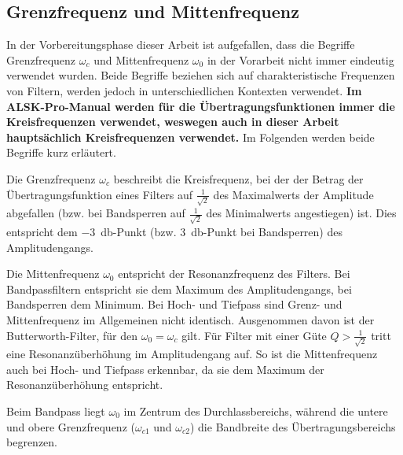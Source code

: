 \documentclass[../main_config.tex]{subfiles}
\begin{document}
\subsection{Grenzfrequenz und Mittenfrequenz}
\label{sec:omega0}
In der Vorbereitungsphase dieser Arbeit ist aufgefallen, dass die Begriffe Grenzfrequenz $\omega_c$ und Mittenfrequenz $\omega_0$ in der Vorarbeit \cite{LabANS} nicht immer eindeutig verwendet wurden. Beide Begriffe beziehen sich auf charakteristische Frequenzen von Filtern, werden jedoch in unterschiedlichen Kontexten verwendet. \textbf{Im ALSK-Pro-Manual werden für die Übertragungsfunktionen immer die Kreisfrequenzen verwendet, weswegen auch in dieser Arbeit hauptsächlich Kreisfrequenzen verwendet.} Im Folgenden werden beide Begriffe kurz erläutert.\par
\medskip


Die Grenzfrequenz $\omega_c$ beschreibt die Kreisfrequenz, bei der der Betrag der Übertragungsfunktion eines Filters auf $\frac{1}{\sqrt{2}}$ des Maximalwerts der Amplitude abgefallen (bzw. bei Bandsperren auf $\frac{1}{\sqrt{2}}$ des Minimalwerts angestiegen) ist. Dies entspricht dem \SI{-3}{\decibel}-Punkt (bzw. \SI{+3}{\decibel}-Punkt bei Bandsperren) des Amplitudengangs.\cite{halbleiter_4Quad}\par 
\medskip
Die Mittenfrequenz $\omega_0$ entspricht der Resonanzfrequenz des Filters. Bei Bandpassfiltern entspricht sie dem Maximum des Amplitudengangs, bei Bandsperren dem Minimum. Bei Hoch- und Tiefpass sind Grenz- und Mittenfrequenz im Allgemeinen nicht identisch. Ausgenommen davon ist der Butterworth-Filter, für den $\omega_0=\omega_c$ gilt. Für Filter mit einer Güte $Q>\frac{1}{\sqrt{2}}$ tritt eine Resonanzüberhöhung im Amplitudengang auf. So ist die Mittenfrequenz auch bei Hoch- und Tiefpass erkennbar, da sie dem Maximum der Resonanzüberhöhung entspricht.\cite{mitten_wiki,halbleiter_4Quad}\par
\medskip

Beim Bandpass liegt $\omega_0$ im Zentrum des Durchlassbereichs, während die untere und obere Grenzfrequenz ($\omega_{c1}$ und $\omega_{c2}$) die Bandbreite des Übertragungsbereichs begrenzen.\par



\end{document}
